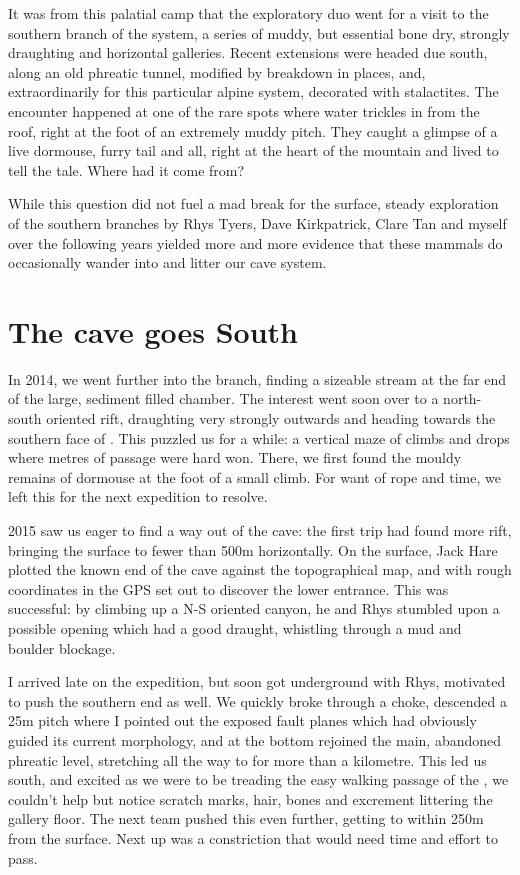 It was from this palatial camp that the exploratory duo went for a visit to the southern branch of the system, a series of muddy, but essential bone dry, strongly draughting and horizontal galleries. Recent extensions were headed due south, along an old phreatic tunnel, modified by breakdown in places, and, extraordinarily for this particular alpine system, decorated with stalactites. The encounter happened at one of the rare spots where water trickles in from the roof, right at the foot of an extremely muddy pitch. They caught a glimpse of a live dormouse, furry tail and all, right at the heart of the mountain and lived to tell the tale. Where had it come from? 

While this question did not fuel a mad break for the surface, steady exploration of the southern branches by Rhys Tyers, Dave Kirkpatrick, Clare Tan and myself over the following years yielded more and more evidence that these mammals do occasionally wander into and litter our cave system.

\section{The cave goes South}

In 2014, we went further into the  branch, finding a sizeable stream at the far end of the large, sediment filled  chamber. The interest went soon over to a north-south oriented rift, draughting very strongly outwards and heading towards the southern face of . This puzzled us for a while: a vertical maze of climbs and drops where metres of passage were hard won. There, we first found the mouldy remains of dormouse at the foot of a small climb. For want of rope and time, we left this for the next expedition to resolve.

2015 saw us eager to find a way out of the cave: the first trip had found more rift, bringing the surface to fewer than 500m horizontally. On the surface, Jack Hare plotted the known end of the cave against the topographical map, and with rough coordinates in the GPS set out to discover the lower entrance. This was successful: by climbing up a N-S oriented canyon, he and Rhys stumbled upon a possible opening which had a good draught, whistling through a mud and boulder blockage. 

I arrived late on the expedition, but soon got underground with Rhys, motivated to push the southern end as well. We quickly broke through a choke, descended a 25m pitch where I pointed out the exposed fault planes which had obviously guided its current morphology, and at the bottom rejoined the main, abandoned phreatic level, stretching all the way to  for more than a kilometre. This led us south, and excited as we were to be treading the easy walking passage of the , we couldn’t help but notice scratch marks, hair, bones and excrement littering the gallery floor. The next team pushed this even further, getting to within 250m from the surface. Next up was a constriction that would need time and effort to pass.

